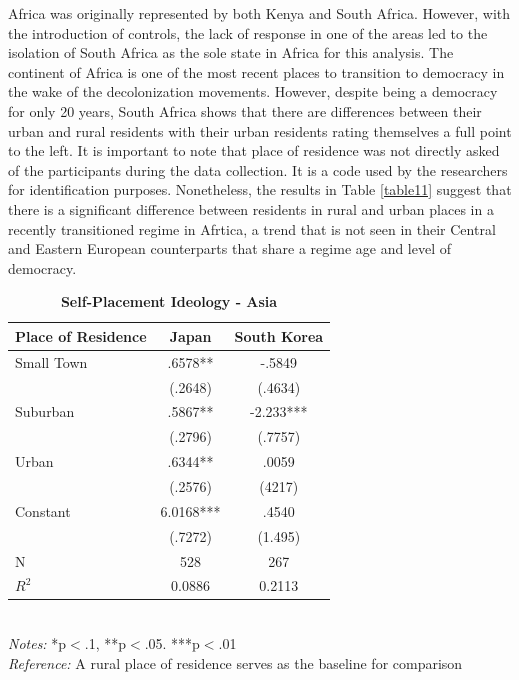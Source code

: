 \documentclass[12pt, titlepage]{article}
\newcommand\e{\emph}
\newcommand\tb{\textbf}
\begin{document}
Africa was originally represented by both Kenya and South Africa. However, with the introduction of controls, the lack of response in one of the areas led to the isolation of South Africa as the sole state in Africa for this analysis. The continent of Africa is one of the most recent places to transition to democracy in the wake of the decolonization movements. However, despite being a democracy for only 20 years, South Africa shows that there are differences between their urban and rural residents with their urban residents rating themselves a full point to the left. It is important to note that place of residence was not directly asked of the participants during the data collection. It is a code used by the researchers for identification purposes. Nonetheless, the results in Table \ref{table11} suggest that there is a significant difference between residents in rural and urban places in a recently transitioned regime in Afrtica, a trend that is not seen in their Central and Eastern European counterparts that share a regime age and level of democracy.

\begin{singlespace}
	\begin{table}[H]
		\centering 
		\caption{\tb{Self-Placement Ideology - Asia}}
		\begin{tabulary}{\linewidth}{l c c}
			\\
			\hline
			\tb{Place of Residence} & \tb{Japan} & \tb{South Korea}\\
			\hline
			Small Town &.6578** & -.5849 \\
			&(.2648) & (.4634)\\
			Suburban&.5867** & -2.233*** \\
			& (.2796) & (.7757)\\
			Urban & .6344** &.0059 \\
			& (.2576) & (4217)\\
			Constant& 6.0168*** & .4540 \\
			& (.7272) & (1.495)\\
			N&528 & 267\\
			$R^2$&0.0886 & 0.2113\\
			\hline
		\end{tabulary}
		\\
		\e{Notes:} *p$<$.1, **p$<$.05. ***p$<$.01 \\
		\e{Reference:} A rural place of residence serves as the baseline for comparison
		\label{table12}
	\end{table}
\end{singlespace}
\end{document}
